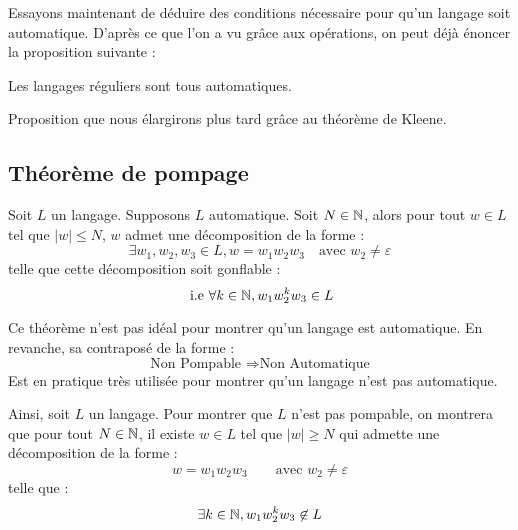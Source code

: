 Essayons maintenant de déduire des conditions nécessaire pour qu'un langage soit automatique. 
D'après ce que l'on a vu grâce aux opérations, on peut déjà énoncer la proposition suivante : 
\begin{proposition}
    Les langages réguliers sont tous automatiques. 
\end{proposition}

Proposition que nous élargirons plus tard grâce au théorème de Kleene. 

\subsection{Théorème de pompage}

\begin{theorem}
    Soit $L$ un langage. Supposons $L$ automatique. 
    Soit $N \in \mathbb{N}$, alors pour tout $w \in L$ tel que $ |w| \leqslant N$, $w$ admet une décomposition 
    de la forme : 
        \[\exists w_1, w_2, w_3 \in L, w = w_1 w_2 w_3 \quad \text{avec } w_2 \not  = \varepsilon \]
    telle que cette décomposition soit gonflable :
        \[ \text{ i.e } \forall k \in \mathbb{N}, w_1 w_2 ^k w_3 \in L \]
\end{theorem} 

Ce théorème n'est pas idéal pour montrer qu'un langage est automatique. En revanche, sa contraposé de la forme :
    \[ \text{Non Pompable } \Longrightarrow \text{Non Automatique} \]  
Est en pratique très utilisée pour montrer qu'un langage n'est pas automatique. 

\begin{proposition}
    Ainsi, soit $L$ un langage. Pour montrer que $L$ n'est pas pompable, on montrera que 
    pour tout $N \in \mathbb{N}$, il existe $w \in L$ tel que $ |w| \geqslant N$ qui admette une décomposition de la forme : 
        \[ w = w_1 w_2 w_3 \quad \quad \text{avec } w_2 \not  = \varepsilon \] 
    telle que : 
        \[ \exists k \in \mathbb{N}, w_1 w_2^k w_3 \not \in L \] 
\end{proposition}

